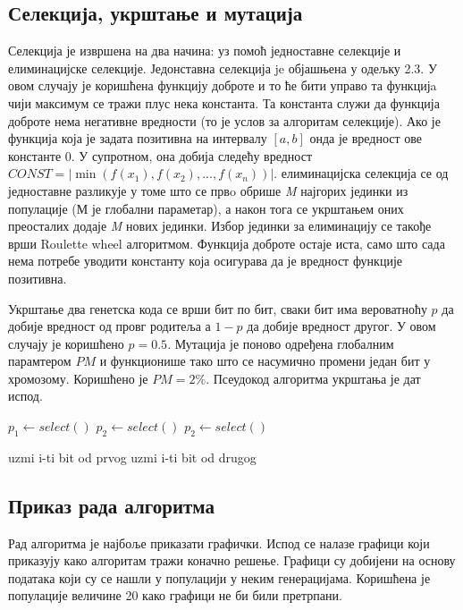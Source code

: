 \documentclass{article}
\begin{document}
\subsection{Селекција, укрштање и мутација}
Селекција је извршена на два начина: уз помоћ једноставне селекције и елиминацијске селекције.
Једонставна селекција je објашњена у одељку 2.3. У овом случају је коришћена функцију доброте и то ће бити управо 
та функцијa чији максимум се тражи плус нека константа. Та константа служи да функција доброте
нема негативне вредности (то је услов за алгоритам селекције). 
Ако је функција која је задата позитивна на интервалу $[a, b]$ онда је вредност 
ове константе 0. У супротном, она добија следећу вредност $CONST = |\min(f(x_1), f(x_2), ..., f(x_n))|$.
елиминацијска селекција се од једноставне разликује у томе што се првo
обрише \textit{M} најгорих јединки из популације (М је глобални параметар), а након тога се укрштањем оних преосталих додаје
\textit{M} нових јединки. Избор јединки за елиминацију се такође врши Roulette wheel алгоритмом.
Функција доброте остаје иста, само што сада нема потребе уводити константу која осигурава да је вредност функције позитивна.

Укрштање два генетска кода се врши бит по бит, сваки бит има вероватноћу  $p$
да добије вредност од провг родитеља а $1 - p$ да добије вредност другог. У овом
случају је коришћено $p = 0.5$. Мутација је поново одређена глобалним парамтером $PM$ 
и функционише тако што се насумично промени један бит у хромозому. Коришћено је 
$PM = 2\%$. Псеудокод алгоритма укрштања је дат испод.

\begin{algorithmic}
    \State $p_1 \gets select()$
    \State $p_2 \gets select()$
        \State $p_2 \gets select()$
    \EndWhile
    
            \State uzmi i-ti bit od prvog 
        \Else
            \State uzmi i-ti bit od drugog
        \EndIf
    \EndFor
\end{algorithmic}

\subsection{Приказ рада алгоритма}
Рад алгоритма је најбоље приказати графички. Испод се налазе графици који приказују како алгоритам 
тражи коначно решење. Графици су добијени на основу података који су се нашли у популацији у неким 
генерацијама. Коришћена је популације величине 20 како графици не би били претрпани.
\end{document}
